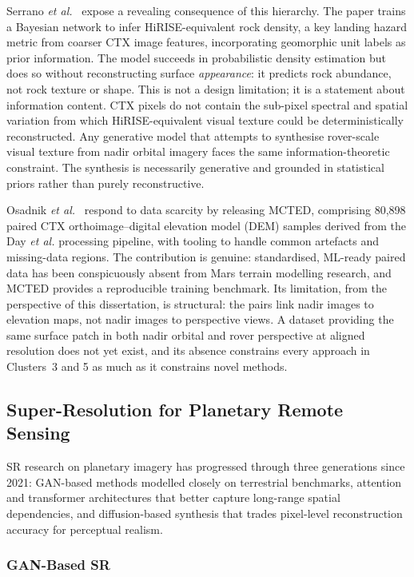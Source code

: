 \documentclass[10pt,journal]{IEEEtran}
\begin{document}
Serrano \textit{et al.}~\cite{serrano2013hirise} expose a revealing consequence
of this hierarchy. The paper trains a Bayesian network to infer HiRISE-equivalent
rock density, a key landing hazard metric from coarser CTX image features,
incorporating geomorphic unit labels as prior information. The model succeeds in
probabilistic density estimation but does so without reconstructing surface
\textit{appearance}: it predicts rock abundance, not rock texture or shape. This
is not a design limitation; it is a statement about information content. CTX
pixels do not contain the sub-pixel spectral and spatial variation from which
HiRISE-equivalent visual texture could be deterministically reconstructed. Any
generative model that attempts to synthesise rover-scale visual texture from
nadir orbital imagery faces the same information-theoretic constraint. The
synthesis is necessarily generative and grounded in statistical priors rather
than purely reconstructive.

Osadnik \textit{et al.}~\cite{osadnik2025mcted} respond to data scarcity by
releasing MCTED, comprising 80,898 paired CTX orthoimage--digital elevation
model (DEM) samples derived from the Day \textit{et al.} processing pipeline,
with tooling to handle common artefacts and missing-data regions. The contribution
is genuine: standardised, ML-ready paired data has been conspicuously absent from
Mars terrain modelling research, and MCTED provides a reproducible training
benchmark. Its limitation, from the perspective of this dissertation, is
structural: the pairs link nadir images to elevation maps, not nadir images to
perspective views. A dataset providing the same surface patch in both nadir
orbital and rover perspective at aligned resolution does not yet exist, and its
absence constrains every approach in Clusters~3 and 5 as much as it constrains
novel methods.

\subsection{Super-Resolution for Planetary Remote Sensing}
\label{subsec:sr}

SR research on planetary imagery has progressed through three generations since
2021: GAN-based methods modelled closely on terrestrial benchmarks, attention and
transformer architectures that better capture long-range spatial dependencies, and
diffusion-based synthesis that trades pixel-level reconstruction accuracy for
perceptual realism.

\subsubsection{GAN-Based SR}
\end{document}

